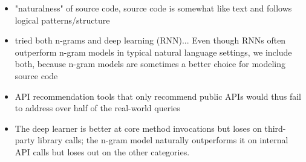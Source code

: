 \begin{itemize}
    \item "naturalness" of source code, source code is somewhat like text and follows logical patterns/structure
    \item tried both n-grams and deep learning (RNN)... Even though RNNs often outperform n-gram models in typical natural language settings, we include both, because n-gram models are sometimes a better choice for modeling source code
    \item API recommendation tools that only recommend public APIs would thus fail to address over half of the real-world queries
    \item The deep learner is better at core method invocations but loses on third-party library calls; the n-gram model naturally outperforms it on internal API calls but loses out on the other categories.
\end{itemize}